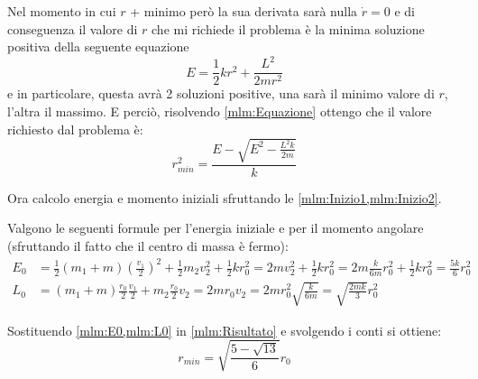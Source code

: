\documentclass[../main.tex]{subfiles}
\begin{document}
Nel momento in cui $r$ + minimo però la sua derivata sarà nulla $\dot r=0$ e di conseguenza il valore di $r$ che mi richiede il problema è la minima soluzione positiva della seguente equazione
\begin{equation}\label{mlm:Equazione}
	E=\frac12kr^2+\frac{L^2}{2mr^2}
\end{equation}
e in particolare, questa avrà 2 soluzioni positive, una sarà il minimo valore di $r$, l'altra il massimo. E perciò, risolvendo \cref{mlm:Equazione} ottengo che il valore richiesto dal problema è:
\begin{equation}\label{mlm:Risultato}
	r^2_{min}=\frac{E-\sqrt{E^2-\frac{L^2k}{2m}}}{k}
\end{equation}

Ora calcolo energia e momento iniziali sfruttando le \cref{mlm:Inizio1,mlm:Inizio2}.

Valgono le seguenti formule per l'energia iniziale e per il momento angolare (sfruttando il fatto che il centro di massa è fermo):
\begin{align}
	E_0 &=\frac12(m_1+m)\left(\frac{v_1}2\right)^2+\frac12m_2v_2^2+\frac12kr_0^2=
	2mv_2^2+\frac12kr_0^2=2m\frac{k}{6m}r_0^2+\frac12kr_0^2=\frac{5k}{6}r_0^2 \label{mlm:E0}\\
	L_0 &=(m_1+m)\frac{r_0}2\frac{v_1}2+m_2\frac{r_0}2v_2=2mr_0v_2=
	2mr_0^2\sqrt{\frac{k}{6m}}=\sqrt{\frac{2mk}3}r_0^2 \label{mlm:L0}
\end{align}

Sostituendo \cref{mlm:E0,mlm:L0} in \cref{mlm:Risultato} e svolgendo i conti si ottiene:
\begin{equation*}
	r_{min}=\sqrt{\frac{5-\sqrt{13}}6}r_0
\end{equation*}
\end{document}

